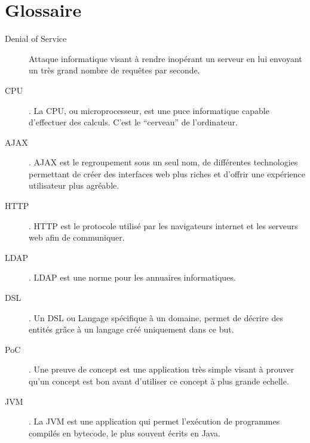 \chapter{Glossaire}
\begin{description}
\item[Denial of Service] Attaque informatique visant à rendre inopérant un serveur en lui envoyant un très grand nombre de requêtes par seconde.
\item[CPU] . La CPU, ou microprocesseur, est une puce informatique capable d'effectuer des calculs. C'est le ``cerveau'' de l'ordinateur.
\item[AJAX] . AJAX est le regroupement sous un seul nom, de différentes technologies permettant de créer des interfaces web plus riches et d'offrir une expérience utilisateur plus agréable.
\item[HTTP] . HTTP est le protocole utilisé par les navigateurs internet et les serveurs web afin de communiquer.
\item[LDAP] . LDAP est une norme pour les annuaires informatiques.
\item[DSL] . Un DSL ou Langage spécifique à un domaine, permet de décrire des entités grâce à un langage créé uniquement dans ce but.
\item[PoC] . Une preuve de concept est une application très simple visant à prouver qu'un concept est bon avant d'utiliser ce concept à plus grande echelle.
\item[JVM] . La JVM est une application qui permet l'exécution de programmes compilés en bytecode, le plus souvent écrits en Java. 
\end{description}